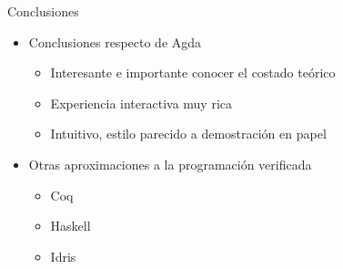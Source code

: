 \documentclass[11pt]{beamer}
\newcommand{\bit}{\begin{itemize}\setlength\itemsep{1em}}
\newcommand{\biti}{\begin{itemize}\setlength\itemsep{0.3em}}
\newcommand{\eit}{\end{itemize}}
\begin{document}
\begin{frame}{Conclusiones}
\bit
\item Conclusiones respecto de Agda
\biti
\item Interesante e importante conocer el costado teórico
\item Experiencia interactiva muy rica
\item Intuitivo, estilo parecido a demostración en papel
\eit
\item Otras aproximaciones a la programación verificada
\biti
\item Coq
\item Haskell
\item Idris
\eit
\eit
\end{frame}
\end{document}
